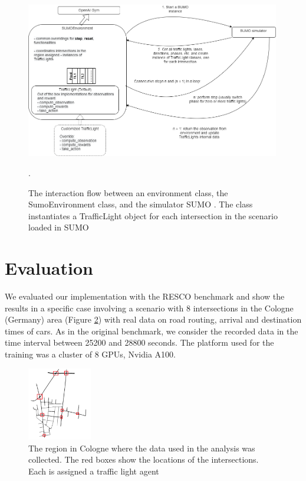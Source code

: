 \documentclass[a4paper,twoside]{article}
\begin{document}
\begin{figure}[!h]
	\includegraphics[width=0.99\textwidth]{sumoenvironment.png}
	\centering
	\caption{The interaction flow between an environment class, the SumoEnvironment class, and the simulator SUMO \cite{SUMMO}. The class instantiates a TrafficLight object for each intersection in the scenario loaded in SUMO }.
	\label{fig:sumoenvironment}
\end{figure}

\section{Evaluation} \label{sec:evaluation}
We evaluated our implementation with the RESCO \cite{ault2021reinforcement} benchmark and show the results in a specific case involving a scenario with 8 intersections in the Cologne (Germany) area (Figure \ref{fig:cologne8}) with real data on road routing, arrival and destination times of cars. As in the original benchmark, we consider the recorded data in the time interval between 25200 and 28800 seconds. The platform used for the training was a cluster of 8 GPUs, Nvidia A100.

\begin{figure}[!h]
	\includegraphics[width=0.25\textwidth]{cologne8.png}
	\centering
	\caption{The region in Cologne where the data used in the analysis was collected. The red boxes show the locations of the intersections. Each is assigned a traffic light agent}
	\label{fig:cologne8}
\end{figure}
\end{document}
